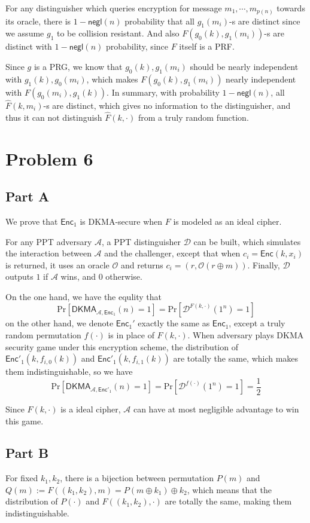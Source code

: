 \documentclass[8pt]{article}
\theoremstyle{compact}
\begin{document}
For any distinguisher which queries encryption for message $m_1, \cdots, m_{p(n)}$ towards its oracle, there is $1 - \textsf{negl}(n)$ probability that all $g_1(m_i)$-s are distinct since we assume $g_1$ to be collision resistant. And also $F(g_0(k), g_1(m_i))$-s are distinct with $1 - \textsf{negl}(n)$ probability, since $F$ itself is a PRF.

Since $g$ is a PRG, we know that $g_0(k), g_1(m_i)$ should be nearly independent with $g_1(k), g_0(m_i)$, which makes $F(g_0(k), g_1(m_i))$ nearly independent with $F(g_0(m_i), g_1(k))$. In summary, with probability $1 - \textsf{negl}(n)$, all $\hat{F}(k, m_i)$-s are distinct, which gives no information to the distinguisher, and thus it can not distinguish $\hat{F}(k, \cdot)$ from a truly random function.

\section*{Problem 6}
\subsection*{Part A}
We prove that $\textsf{Enc}_1$ is DKMA-secure when $F$ is modeled as an ideal cipher.

For any PPT adversary $\mathcal A$, a PPT distinguisher $\mathcal D$ can be built, which simulates the interaction between $\mathcal A$ and the challenger, except that when $c_i = \textsf{Enc}(k, x_i)$ is returned, it uses an oracle $\mathcal O$ and returns $c_i = (r, \mathcal O(r \oplus m))$. Finally, $\mathcal D$ outputs $1$ if $\mathcal A$ wins, and $0$ otherwise.

On the one hand, we have the equlity that $$\text{Pr}\left[\textsf{DKMA}_{\mathcal A, \textsf{Enc}_1}(n) = 1\right] = \text{Pr}\left[\mathcal D^{F(k, \cdot)}(1^n) = 1\right]$$ on the other hand, we denote $\textsf{Enc}_1'$ exactly the same as $\textsf{Enc}_1$, except a truly random permutation $f(\cdot)$ is in place of $F(k, \cdot)$. When adversary plays DKMA security game under this encryption scheme, the distribution of $\textsf{Enc}'_1(k, f_{i, 0}(k))$ and $\textsf{Enc}'_1(k, f_{i, 1}(k))$ are totally the same, which makes them indistinguishable, so we have $$\text{Pr}\left[\textsf{DKMA}_{\mathcal A, \textsf{Enc}'_1}(n) = 1\right] = \text{Pr}\left[\mathcal D^{f(\cdot)}(1^n) = 1\right] = \frac12$$

Since $F(k, \cdot)$ is a ideal cipher, $\mathcal A$ can have at most negligible advantage to win this game.
\subsection*{Part B}
For fixed $k_1, k_2$, there is a bijection between permutation $P(m)$ and $Q(m) := F((k_1, k_2), m) = P(m \oplus k_1) \oplus k_2$, which means that the distribution of $P(\cdot)$ and $F((k_1, k_2), \cdot)$ are totally the same, making them indistinguishable.
\end{document}
